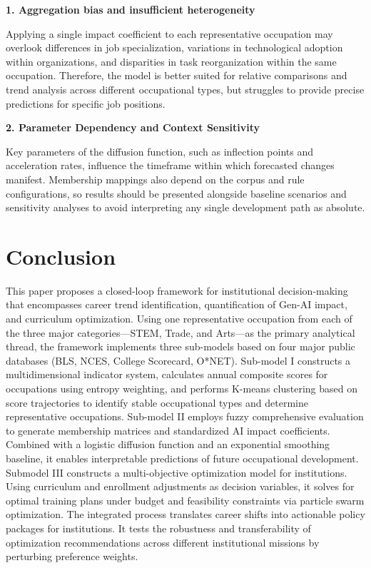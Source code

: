 \documentclass{mcmthesis}
\begin{document}
\noindent\textbf{1. Aggregation bias and insufficient heterogeneity}

Applying a single impact coefficient to each representative occupation may overlook differences in job specialization, variations in technological adoption within organizations, and disparities in task reorganization within the same occupation. Therefore, the model is better suited for relative comparisons and trend analysis across different occupational types, but struggles to provide precise predictions for specific job positions.

\medskip

\noindent\textbf{2. Parameter Dependency and Context Sensitivity}

Key parameters of the diffusion function, such as inflection points and acceleration rates, influence the timeframe within which forecasted changes manifest. Membership mappings also depend on the corpus and rule configurations, so results should be presented alongside baseline scenarios and sensitivity analyses to avoid interpreting any single development path as absolute.








\section{Conclusion}
This paper proposes a closed-loop framework for institutional decision-making that encompasses career trend identification, quantification of Gen-AI impact, and curriculum optimization. Using one representative occupation from each of the three major categories—STEM, Trade, and Arts—as the primary analytical thread, the framework implements three sub-models based on four major public databases (BLS, NCES, College Scorecard, O*NET).
Sub-model I constructs a multidimensional indicator system, calculates annual composite scores for occupations using entropy weighting, and performs K-means clustering based on score trajectories to identify stable occupational types and determine representative occupations.
Sub-model II employs fuzzy comprehensive evaluation to generate membership matrices and standardized AI impact coefficients. Combined with a logistic diffusion function and an exponential smoothing baseline, it enables interpretable predictions of future occupational development.
Submodel III constructs a multi-objective optimization model for institutions. Using curriculum and enrollment adjustments as decision variables, it solves for optimal training plans under budget and feasibility constraints via particle swarm optimization.
The integrated process translates career shifts into actionable policy packages for institutions. It tests the robustness and transferability of optimization recommendations across different institutional missions by perturbing preference weights.
\end{document}
